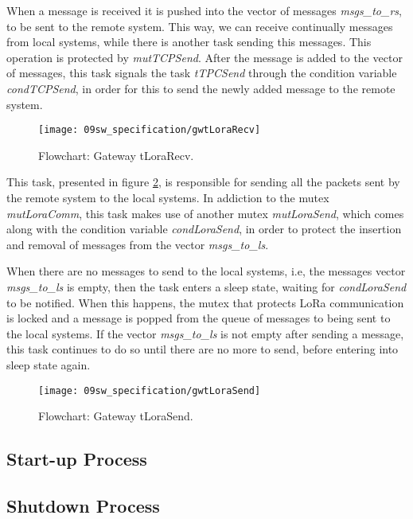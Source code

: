 When a message is received it is pushed into the vector of messages \textit{msgs\_to\_rs}, to be sent to the remote system. This way, we can receive continually messages from local systems, while there is another task sending this messages. This operation is protected by \textit{mutTCPSend}. After the message is added to the vector of messages, this task signals the task \textit{tTPCSend} through the condition variable \textit{condTCPSend}, in order for this to send the newly added message to the remote system.

\begin{figure}[H]
	\centering
	\texttt{[image: 09sw\_specification/gwtLoraRecv]}
	\caption{Flowchart: Gateway tLoraRecv.}
	\label{fig:gwtLoraRecv}
\end{figure}

This task, presented in figure \ref{fig:gwtLoraSend}, is responsible for sending all the packets sent by the remote system to the local systems. In addiction to the mutex \textit{mutLoraComm}, this task makes use of another mutex \textit{mutLoraSend}, which comes along with the condition variable \textit{condLoraSend}, in order to protect the insertion and removal of messages from the vector \textit{msgs\_to\_ls}.

When there are no messages to send to the local systems, i.e, the messages vector \textit{msgs\_to\_ls} is empty, then the task enters a sleep state, waiting for \textit{condLoraSend} to be notified. When this happens, the mutex that protects LoRa communication is locked and a message is popped from the queue of messages to being sent to the local systems. If the vector \textit{msgs\_to\_ls} is not empty after sending a message, this task continues to do so until there are no more to send, before entering into sleep state again.

\begin{figure}[H]
	\centering
	\texttt{[image: 09sw\_specification/gwtLoraSend]}
	\caption{Flowchart: Gateway tLoraSend.}
	\label{fig:gwtLoraSend}
\end{figure}


\subsection{Start-up Process}

\subsection{Shutdown Process}
